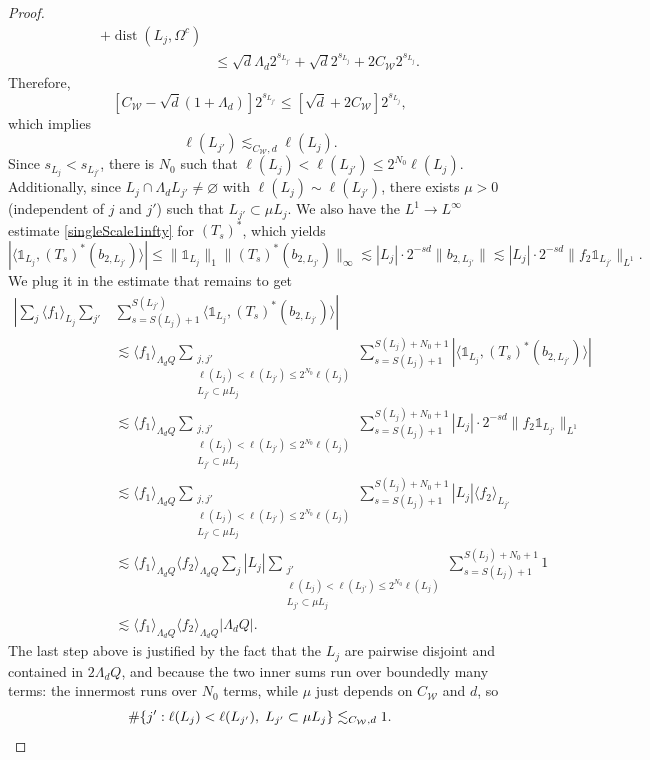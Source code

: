 \documentclass[12pt]{amsart}
\newcommand{\dist}[1]{\operatorname{dist}\left(#1\right) }
\newcommand{\one}{\mathds{1}}
\theoremstyle{plain}
\theoremstyle{definition} %
\numberwithin{equation}{section}
\begin{document}
\begin{proof}
\begin{align*}
+
\dist{L_j,\Omega^c}
\\&\leq %
\sqrt{d}\Lambda_d2^{s_{L_{j'}}}
+
\sqrt{d}2^{s_{L_j}}
+
2C_{\mathcal{W}}2^{s_{L_j}}.    
\end{align*}
Therefore,
\[
[C_{\mathcal{W}}-\sqrt{d}(1+\Lambda_d)]2^{s_{L_{j'}}}
\leq 
[\sqrt{d}+2C_{\mathcal{W}}]2^{s_{L_j}},
\]
which implies
\[
\ell(L_{j'})
\lesssim_{C_{\mathcal{W}},d} 
\ell(L_j).
\]
Since $s_{L_j}<s_{L_{j'}}$, there is $N_0$ such that $\ell(L_j) < \ell(L_{j'})\leq 2^{N_0}\ell(L_j)$. Additionally, since $L_j\cap \Lambda_dL_{j'}\neq \varnothing$ with $\ell(L_j)\sim \ell(L_{j'})$, there exists $\mu>0$ (independent of $j$ and $j'$) such that $L_{j'}\subset \mu L_{j}$. We also have the $L^1\to L^\infty$ estimate \eqref{singleScale1infty} for $(T_s)^{\ast}$, which yields
\[
|\langle \one_{L_j},(T_s)^{\ast}(b_{2,L_{j'}})\rangle|
\leq 
\|\one_{L_j}\|_{1}
\|(T_s)^{\ast}(b_{2,L_{j'}})\|_{\infty}
\lesssim 
|L_j|\cdot
2^{-sd}\|b_{2,L_{j'}}\|
\lesssim 
|L_j|\cdot2^{-sd}\|f_2\one_{L_{j'}}\|_{L^1}.
\]
We plug it in the estimate that remains to get
\begin{align*}
\left|\sum_{j}\langle f_1\rangle_{L_j}\sum_{j'} \right. & \left. \sum_{s=S(L_j)+1}^{S(L_{j'})}\langle \one_{L_j},(T_s)^{\ast}(b_{2,L_{j'}})\rangle \right| \\
& \lesssim \langle f_1\rangle_{\Lambda_d Q}  \sum_{\substack{j,j'\\ \ell(L_j)<\ell(L_{j'})\leq 2^{N_0} \ell(L_j)\\ L_{j'}\subset \mu L_j}}
\sum_{s=S(L_j)+1}^{S(L_{j})+N_0+1}
\left|\langle \one_{L_j},(T_s)^{\ast}(b_{2,L_{j'}})\rangle\right| \\
& \lesssim \langle f_1\rangle_{\Lambda_d Q}  \sum_{\substack{j,j'\\ \ell(L_j)<\ell(L_{j'})\leq 2^{N_0} \ell(L_j)\\ L_{j'}\subset \mu L_j}}
\sum_{s=S(L_j)+1}^{S(L_{j})+N_0+1}
|L_j|\cdot2^{-sd}\|f_2\one_{L_{j'}}\|_{L^1} \\
& \lesssim \langle f_1\rangle_{\Lambda_d Q}  \sum_{\substack{j,j'\\ \ell(L_j)<\ell(L_{j'})\leq 2^{N_0} \ell(L_j)\\ L_{j'}\subset \mu L_j}}
\sum_{s=S(L_j)+1}^{S(L_{j})+N_0+1}
|L_{j}|\langle f_2\rangle_{L_{j'}}\\
& \lesssim \langle f_1\rangle_{\Lambda_d Q} \langle f_2\rangle_{\Lambda_d Q} \sum_j |L_{j}|\sum_{\substack{j'\\ \ell(L_j)<\ell(L_{j'})\leq 2^{N_0} \ell(L_j)\\ L_{j'}\subset \mu L_j}} \sum_{s=S(L_j)+1}^{S(L_{j})+N_0+1} 1\\
& \lesssim \langle f_1\rangle_{\Lambda_d Q}
\langle f_2\rangle_{\Lambda_d Q}|\Lambda_d Q|.
\end{align*}
The last step above is justified by the fact that the $L_j$ are pairwise disjoint and contained in $2\Lambda_d Q$, and because the two inner sums run over boundedly many terms: the innermost runs over $N_0$ terms, while $\mu$ just depends on $C_{\mathcal{W}}$ and $d$, so
\[
\#\{j': \ell(L_j)<\ell(L_{j'}),\hspace{0.1cm} L_{j'}\subset \mu L_j\}
\lesssim_{C_{\mathcal{W}},d}
1.
\]


\end{proof}
\end{document}
